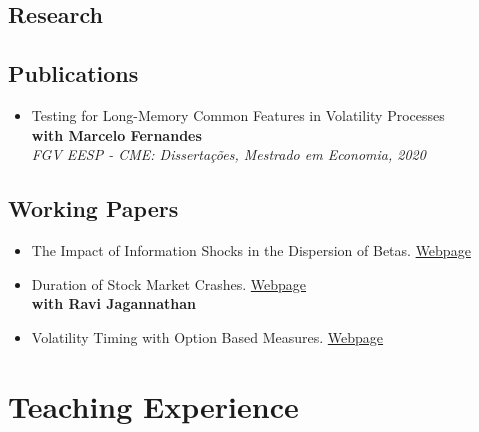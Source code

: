 \documentclass[a4paper,10pt]{article}
\begin{document}
\begin{samepage}
\section{Research}
\subsection{Publications}
\begin{itemize}[label={}]
    \item Testing for Long-Memory Common Features in Volatility Processes \\
    \textbf{with Marcelo Fernandes} \\
    \textit{FGV EESP - CME: Dissertações, Mestrado em Economia, 2020}
\end{itemize}
\subsection{Working Papers}
\begin{itemize}
    \item The Impact of Information Shocks in the Dispersion of Betas. \href{https://joseparreiras.github.io/projects/news-and-betas}{Webpage}
    \item Duration of Stock Market Crashes. \href{https://joseparreiras.github.io/projects/news-and-betas}{Webpage} \\
    \textbf{with Ravi Jagannathan}
    \item Volatility Timing with Option Based Measures. \href{https://joseparreiras.github.io/projects/news-and-betas}{Webpage}
\end{itemize}
\end{samepage}


\section{Teaching Experience}
\end{document}
